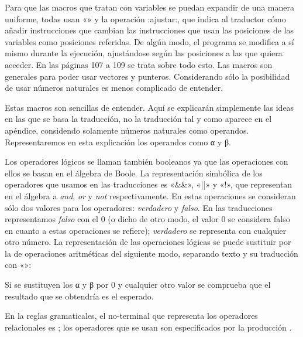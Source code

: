 Para que las macros que tratan con variables se puedan expandir de una ma\-ne\-ra uniforme, todas
usan «» y la operación {\fcode:ajustar:}, que indica al traductor cómo añadir
instrucciones que cambian las instrucciones que usan las posiciones de las variables como posiciones
referidas. De algún modo, el programa se modifica a sí mismo durante la ejecución, ajustándose según
las posiciones a las que quiera acceder. En las páginas 107 a 109 se trata sobre todo esto. Las
macros son generales para poder usar vectores y punteros. Considerando sólo la posibilidad de usar
números naturales es menos complicado de entender.

%
Estas macros son sencillas de entender. Aquí se explicarán simplemente las ideas en las que se basa
la traducción, no la traducción tal y como aparece en el apéndice, considendo solamente números
naturales como operandos. Representaremos en esta explicación los operandos como {\fgramatnoterm α}
y {\fgramatnoterm β}.

Los operadores lógicos se llaman también booleanos ya que las operaciones con ellos se basan en el
álgebra de Boole. La representación simbólica de los ope\-ra\-dores que usamos en las traducciones
es «\&\&», «||» y «!», que representan en el álgebra a {\it and}, {\it or} y {\it not}
respectivamente. En estas operaciones se consideran sólo dos valores para los operadores: {\it
verdadero} y {\it falso}. En las traducciones re\-pre\-sentamos {\it falso} con el 0 (o dicho de otro modo, el
valor 0 se considera falso en cuanto a estas operaciones se refiere); {\it verdadero} se representa
con cualquier otro número. La representación de las operaciones lógicas se puede sustituir por la de
operaciones aritméticas del siguiente modo, separando texto y su traducción con «\flechagram{}»:
\listraducciones
\noindent{}\par
\noindent{}\par
\noindent{}
\finlistatrad
Si se sustituyen los α y β por 0 y cualquier otro valor se comprueba que el resultado que se
obtendría es el esperado.

En la reglas gramaticales, el no-terminal que representa los operadores relacionales
es ; los operadores que se usan son especificados por la producción
\encaje
{} \fin .
\finencaje

